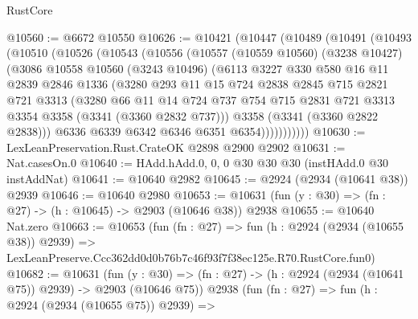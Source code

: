 \begin{lexlean}{RustCore}
\begin{coremodule}
@10560 := @6672 @10550
@10626 := @10421
    (@10447
      (@10489
        (@10491
          (@10493
            (@10510
              (@10526
                (@10543
                  (@10556
                    (@10557
                      (@10559 @10560)
                      (@3238 @10427)
                      (@3086
                        @10558
                        @10560
                        (@3243 @10496)
                        (@6113
                          @3227
                          @330
                          @580
                          @16
                          @11
                          @2839
                          @2846
                          @1336
                          (@3280
                            @293
                            @11
                            @15
                            @724
                            @2838
                            @2845
                            @715
                            @2821
                            @721
                            @3313
                            (@3280
                              @66
                              @11
                              @14
                              @724
                              @737
                              @754
                              @715
                              @2831
                              @721
                              @3313
                              @3354
                              @3358
                              (@3341 (@3360 @2832 @737)))
                            @3358
                            (@3341 (@3360 @2822 @2838)))
                          @6336
                          @6339
                          @6342
                          @6346
                          @6351
                          @6354)))))))))))
@10630 := LexLeanPreservation.Rust.CrateOK @2898 @2900 @2902
@10631 := Nat.casesOn.{0}
@10640 := HAdd.hAdd.{0, 0, 0} @30 @30 @30 (instHAdd.{0} @30 instAddNat)
@10641 := @10640 @2982
@10645 := @2924 (@2934 (@10641 @38)) @2939
@10646 := @10640 @2980
@10653 := @10631 (fun (y : @30) => (fn : @27) -> (h : @10645) -> @2903 (@10646 @38)) @2938
@10655 := @10640 Nat.zero
@10663 := @10653
    (fun (fn : @27) =>
    fun (h : @2924 (@2934 (@10655 @38)) @2939) =>
    LexLeanPreserve.Ccc362dd0d0b76b7c46f93f7f38ec125e.R70.RustCore.fun0)
@10682 := @10631
    (fun (y : @30) => (fn : @27) -> (h : @2924 (@2934 (@10641 @75)) @2939) -> @2903 (@10646 @75))
    @2938
    (fun (fn : @27) =>
    fun (h : @2924 (@2934 (@10655 @75)) @2939) =>

\end{coremodule}
\end{lexlean}
